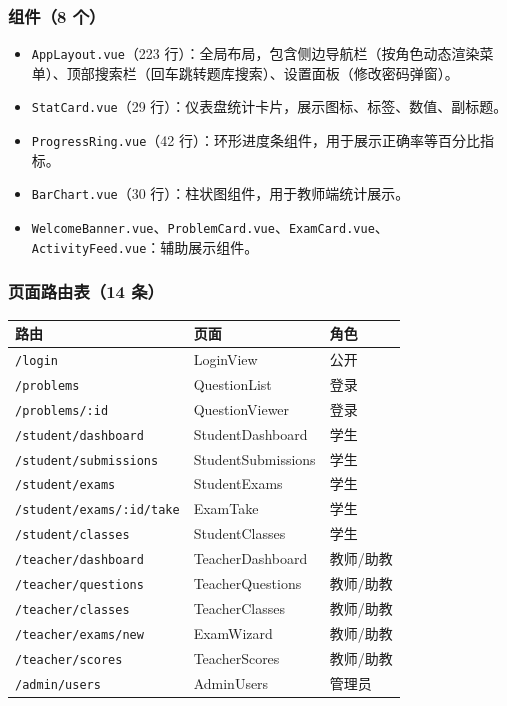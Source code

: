 \documentclass[12pt,a4paper]{ctexart}
\begin{document}
\subsubsection*{组件（8 个）}

\begin{itemize}
  \item \texttt{AppLayout.vue}（223 行）：全局布局，包含侧边导航栏（按角色动态渲染菜单）、顶部搜索栏（回车跳转题库搜索）、设置面板（修改密码弹窗）。
  \item \texttt{StatCard.vue}（29 行）：仪表盘统计卡片，展示图标、标签、数值、副标题。
  \item \texttt{ProgressRing.vue}（42 行）：环形进度条组件，用于展示正确率等百分比指标。
  \item \texttt{BarChart.vue}（30 行）：柱状图组件，用于教师端统计展示。
  \item \texttt{WelcomeBanner.vue}、\texttt{ProblemCard.vue}、\texttt{ExamCard.vue}、\texttt{ActivityFeed.vue}：辅助展示组件。
\end{itemize}

\subsubsection*{页面路由表（14 条）}

\begin{table}[h]
\centering
\begin{tabular}{lll}
\hline
路由 & 页面 & 角色 \\
\hline
\texttt{/login}                              & LoginView          & 公开 \\
\texttt{/problems}                           & QuestionList       & 登录 \\
\texttt{/problems/:id}                       & QuestionViewer     & 登录 \\
\texttt{/student/dashboard}                  & StudentDashboard   & 学生 \\
\texttt{/student/submissions}                & StudentSubmissions & 学生 \\
\texttt{/student/exams}                      & StudentExams       & 学生 \\
\texttt{/student/exams/:id/take}             & ExamTake           & 学生 \\
\texttt{/student/classes}                    & StudentClasses     & 学生 \\
\texttt{/teacher/dashboard}                  & TeacherDashboard   & 教师/助教 \\
\texttt{/teacher/questions}                  & TeacherQuestions   & 教师/助教 \\
\texttt{/teacher/classes}                    & TeacherClasses     & 教师/助教 \\
\texttt{/teacher/exams/new}                  & ExamWizard         & 教师/助教 \\
\texttt{/teacher/scores}                     & TeacherScores      & 教师/助教 \\
\texttt{/admin/users}                        & AdminUsers         & 管理员 \\
\hline
\end{tabular}
\end{table}
\end{document}
